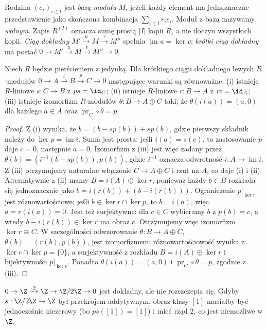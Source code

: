 \begin{definicja}
Rodzina $(e_i)_{i\in I}$ jest \emph{bazą modułu} $M$,
jeżeli każdy element ma jednoznaczne przedstawienie jako
skończona kombinacja $\sum_{i\in I}r_ie_i$.
Moduł z bazą nazywamy \emph{wolnym}. Zapis $R^{(I)}$
oznacza sumę prostą $|I|$ kopii $R$, a nie iloczyn wszystkich
kopii. \emph{Ciąg dokładny} $M'\xrightarrow{u}M\xrightarrow{v}M''$
spełnia $\operatorname{im}u=\ker v$; \emph{krótki ciąg dokładny}
ma postać $0\to M'\xrightarrow{u}M\xrightarrow{v}M''\to0$.
\end{definicja}
\begin{twierdzenie}
Niech $R$ będzie pierścieniem z jedynką.
Dla krótkiego ciągu dokładnego lewych $R$-modułów
$0\to A\xrightarrow{i}B\xrightarrow{p}C\to0$
następujące warunki są równoważne:
(i) istnieje $R$-liniowe $s:C\to B$ z $ps=\id_C$;
(ii) istnieje $R$-liniowe $r:B\to A$ z $ri=\id_A$;
(iii) istnieje izomorfizm $R$-modułów $\theta:B\to A\oplus C$
taki, że $\theta(i(a))=(a,0)$ dla każdego $a\in A$ oraz
$\operatorname{pr}_C\circ\theta=p$.
\end{twierdzenie}
\begin{proof}
Z (i) wynika, że $b=(b-sp(b))+sp(b)$, gdzie pierwszy
składnik należy do $\ker p=\operatorname{im}i$.
Suma jest prosta: jeśli $i(a)=s(c)$, to zastosowanie $p$
daje $c=0$, następnie $a=0$. Izomorfizm z (iii) jest więc
zadany przez $\theta(b)=(i^{-1}(b-sp(b)),p(b))$,
gdzie $i^{-1}$ oznacza odwrotność $i:A\to\operatorname{im}i$.
Z (iii) otrzymujemy naturalne włączenie $C\to A\oplus C$
i rzut na $A$, co daje (i) i (ii). Alternatywnie z (ii) mamy
$B=i(A)\oplus\ker r$, ponieważ każdy $b\in B$
rozkłada się jednoznacznie jako
$b=i(r(b))+(b-i(r(b)))$.
Ograniczenie $p|_{\ker r}$ jest różnowartościowe:
jeśli $b\in\ker r\cap\ker p$, to $b=i(a)$,
więc $a=r(i(a))=0$. Jest też surjektywne:
dla $c\in C$ wybieramy $b$ z $p(b)=c$,
a wtedy $b-i(r(b))\in\ker r$ ma obraz $c$.
Otrzymujemy więc izomorfizm $\ker r\cong C$.
W szczególności odwzorowanie
$\theta:B\to A\oplus C$, $\theta(b)=(r(b),p(b))$,
jest izomorfizmem: różnowartościowość wynika z
$\ker r\cap\ker p=\{0\}$, a surjektywność z rozkładu
$B=i(A)\oplus\ker r$ i bijektywności $p|_{\ker r}$.
Ponadto $\theta(i(a))=(a,0)$ i
$\operatorname{pr}_C\circ\theta=p$, zgodnie z (iii).
\end{proof}
\begin{przyklad}
$0\to\Z\xrightarrow{\cdot 2}\Z\to\Z/2\Z\to0$
jest dokładny, ale nie rozszczepia się. Gdyby $s:\Z/2\Z\to\Z$
był przekrojem addytywnym, obraz klasy $[1]$ musiałby być
jednocześnie niezerowy (bo $ps([1])=[1]$) i mieć rząd $2$,
co jest niemożliwe w $\Z$.
\end{przyklad}


